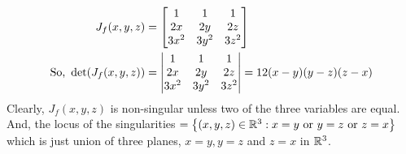 \clearpage
\begin{soln}{8}
   \begin{align*}
    J_{f}(x,y,z) 
    &= \begin{bmatrix}
      1 & 1 & 1 \\ 
      2x & 2y & 2z \\ 
      3x^2 & 3y^2 & 3z^2
    \end{bmatrix} \\ 
    \text{So, } \det(J_f(x,y,z)) 
    &= \left| {\begin{matrix}
      1 & 1 & 1 \\ 
      2x & 2y & 2z \\ 
      3x^2 & 3y^2 & 3z^2
    \end{matrix}} \right| = 12(x-y)(y-z)(z-x)
   \end{align*}
   Clearly, $ J_{f}(x,y,z)  $ is non-singular unless two of the three variables are equal. And, the locus of the singularities $ = \left\{ (x,y,z) \in \mathbb{R}^3 : x=y \text{ or } y=z \text{ or } z=x \right\} $  which is just union of three planes, $ x=y, y=z $ and $ z=x $ in $ \mathbb{R}^3 $.
\end{soln}
